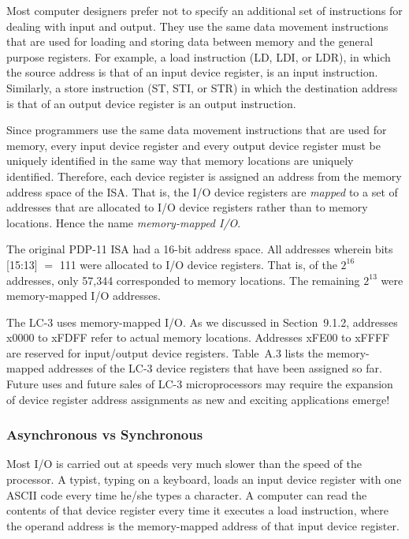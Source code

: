 \documentclass{patt}
\begin{document}
Most computer designers prefer not to specify an additional set of
instructions for dealing with input and output. They use the same data
movement instructions that are used for loading and storing data
between memory and the general purpose registers.  For example, a load
instruction (LD, LDI, or LDR), in which the source address is that of an 
input device register, is an input instruction.  Similarly, a store 
instruction (ST, STI, or STR) in which the destination address is that of 
an output device register is an output instruction.

Since programmers use the same data movement instructions that are
used for memory, every input device register and every output device
register must be uniquely identified in the same way that memory
locations are uniquely identified.  Therefore, each device register is
assigned an address from the memory address space of the ISA. That is,
the I/O device registers are {\em mapped} to a set of addresses that
are allocated to I/O device registers rather than to memory locations.
Hence the name {\em memory-mapped I/O}.  

The original PDP-11 ISA had a 16-bit address space.  All addresses
wherein bits [15:13] $=$ 111 were allocated to I/O device registers.
That is, of the $2^{16}$ addresses, only 57,344 corresponded to memory
locations.  The remaining $2^{13}$ were memory-mapped I/O addresses.

The LC-3 uses memory-mapped I/O.  As we discussed in Section~9.1.2, 
addresses x0000 to xFDFF refer to actual memory locations.  Addresses 
xFE00 to xFFFF are reserved for input/output device registers.  Table~A.3 
lists the memory-mapped addresses of the LC-3 device registers that have 
been assigned so far.  Future uses and future sales of LC-3 microprocessors 
may require the expansion of device register address assignments as new and 
exciting applications emerge!

\subsubsection{Asynchronous vs Synchronous}

Most I/O is carried out at speeds very much slower than the speed of
the processor.  A typist, typing on a keyboard, loads an input device
register with one ASCII code every time he/she types a character.  A
computer can read the contents of that device register every time it
executes a load instruction, where the operand address is the
memory-mapped address of that input device register.
\end{document}
